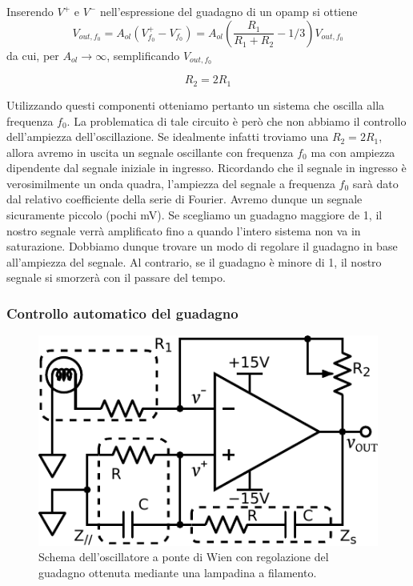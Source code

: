 Inserendo $V^+$ e $V^-$ nell'espressione del guadagno di un opamp si ottiene
\vspace{-2mm}
\begin{equation}
	V_{out,f_0} = A_{ol}\left( V^+_{f_0} - V^-_{f_0} \right) = A_{ol}\left(\frac{R_1}{R_1+R_2} - 1/3\right)V_{out,f_0}
\end{equation}
\vspace{-4mm}
da cui, per $A_{ol} \rightarrow \infty$, semplificando $V_{out,f_0}$

\begin{equation}
	R_2 = 2 R_1
\end{equation}

Utilizzando questi componenti otteniamo pertanto un sistema che oscilla alla frequenza $f_0$.
La problematica di tale circuito è però che non abbiamo il controllo dell'ampiezza dell'oscillazione. Se idealmente infatti troviamo una $R_2 = 2 R_1$, allora avremo in uscita un segnale oscillante con frequenza $f_0$ ma con ampiezza dipendente dal segnale iniziale in ingresso. Ricordando che il segnale in ingresso è verosimilmente un onda quadra, l'ampiezza del segnale a frequenza $f_0$ sarà dato dal relativo coefficiente della serie di Fourier. Avremo dunque un segnale sicuramente piccolo (pochi \si{\milli\volt}). Se scegliamo un guadagno maggiore de 1, il nostro segnale verrà amplificato fino a quando l'intero sistema non va in saturazione. Dobbiamo dunque trovare un modo di regolare il guadagno in base all'ampiezza del segnale. Al contrario, se il guadagno è minore di 1, il nostro segnale si smorzerà con il passare del tempo. 

\subsubsection*{Controllo automatico del guadagno}

\begin{figure}
\centering
\includegraphics[width=.35\textwidth]{../E08/latex/osc_w_lamp.pdf}
\caption{Schema dell'oscillatore a ponte di Wien con regolazione del guadagno ottenuta mediante una lampadina a filamento.}
\label{cir8:with_lamp}
\end{figure}

